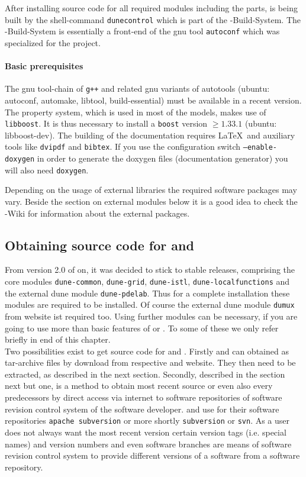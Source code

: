 After installing source code for all required \Dune modules including the \Dumux parts, \Dune is being built by the shell-command \texttt{dunecontrol} which is part of the {\Dune}-Build-System. The {\Dune}-Build-System is essentially a front-end of the gnu tool \texttt{autoconf} which was specialized for the \Dune project.

\paragraph{Basic prerequisites} \label{prerequisites}
The gnu tool-chain of \texttt{g++}  and related gnu variants of autotools (ubuntu: autoconf, automake, libtool, build-essential) must be available in a recent version. 
The \Dumux property system, which is used in most of the models, makes use of \texttt{libboost}. 
It is thus necessary to install a  \texttt{boost}  version $\geqslant 1.33.1$ (ubuntu: libboost-dev). 
The building of the documentation requires \LaTeX\ and auxiliary tools like \texttt{dvipdf} and \texttt{bibtex}. 
If you use the configuration switch \texttt{--enable-doxygen} in order to generate the doxygen files (documentation generator) you will also need \texttt{doxygen}.

Depending on the usage of external libraries the required software packages may vary. 
Beside the section on external modules below it is a good idea to check the {\Dune}-Wiki \cite{DUNE-HP} for information about the external packages.

\subsection{Obtaining source code for \Dune and \Dumux}
From version 2.0 of \Dune on, it was decided to stick to stable \Dune releases, comprising the core modules 
\texttt{dune-common}, \texttt{dune-grid}, \texttt{dune-istl}, \texttt{dune-localfunctions} and the external dune module \texttt{dune-pdelab}. Thus for a complete \Dumux installation these modules are required to be installed. Of course the external dune module \texttt{dumux} from \Dumux website ist required too. Using further modules can be necessary, if you are going to use more than basic features of \Dune or \Dumux. To some of these we only refer briefly in end of this chapter.\\

Two possibilities exist to get source code for \Dune and \Dumux.
Firstly \Dune and \Dumux can obtained as tar-archive files by download from respective {\Dune} and {\Dumux} website. They then need to be extracted, as described in the next section.
Secondly, described in the section next but one, is a method to obtain most recent source or even also every predecessors by direct access via internet to software repositories of software revision control system of the software developer. \Dune and \Dumux use for their software repositories \texttt{apache subversion} or more shortly \texttt{subversion} or \texttt{svn}.
As a user does not always want the most recent version
certain version tags (i.e. special names) and version numbers and even software branches are means of software revision control system to provide different versions of a software from a software repository.

